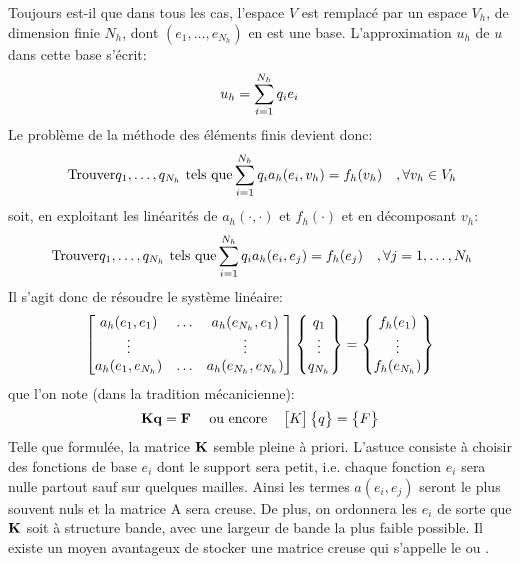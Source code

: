 \medskip
Toujours est-il que dans tous les cas, l'espace $V$ est remplacé par un espace $V_h$, de dimension
finie $N_h$, dont $(e_1,\ldots, e_{N_h})$ en est une base.
L'approximation $u_h$ de $u$ dans cette base s'écrit:
\begin{equation}
u_h=\displaystyle\sum_{i=1}^{N_h} q_i e_i
\end{equation}
\medskip
Le problème de la méthode des éléments finis devient donc:
\begin{equation}
\text{ Trouver} q_1,\ldots, q_{N_h} \text{ tels que}
\displaystyle\sum_{i=1}^{N_h} q_i a_h(e_i,v_h) = f_h(v_h) \quad , \forall v_h\in V_h
\end{equation}
soit, en exploitant les linéarités de $a_h(\cdot,\cdot)$ et $f_h(\cdot)$ et en décomposant $v_h$:
\begin{equation}\label{Eq-Ph}
\text{ Trouver} q_1,\ldots, q_{N_h} \text{ tels que}
\displaystyle\sum_{i=1}^{N_h} q_i a_h(e_i,e_j) = f_h(e_j) \quad ,\forall j=1,\ldots, N_h
\end{equation}
\medskip
Il s'agit donc de résoudre le système linéaire:
\begin{equation}
\MM*{%
a_h(e_1,e_1) & \dots & a_h(e_{N_h},e_1)\\
\vdots & & \vdots \\
a_h(e_1,e_{N_h}) & \dots & a_h(e_{N_h},e_{N_h})
}
\VV*{%
q_1\\
\vdots\\
q_{N_h}
}
=
\VV*{%
f_h(e_1)\\
$\vdots$\\
f_h(e_{N_h})
}
\end{equation}
que l'on note (dans la tradition mécanicienne):
\begin{equation}\mathbf{Kq=F} \quad \text{ ou encore} \quad \MM*{K}\VV*{q}=\VV*{F}
\end{equation}
\medskip
Telle que formulée, la matrice $\MM{K}$ semble pleine à priori.
L'astuce consiste à choisir des fonctions de base $e_i$ dont le support sera petit,
i.e. chaque fonction $e_i$ sera nulle partout sauf sur quelques mailles.
Ainsi les termes $a(e_i,e_j)$ seront le plus souvent nuls et la matrice A sera creuse.
De plus, on ordonnera les $e_i$ de sorte que $\MM{K}$ soit à structure bande, avec une
largeur de bande la plus faible possible.
Il existe un moyen avantageux de stocker une matrice creuse qui s'appelle le
 ou .


